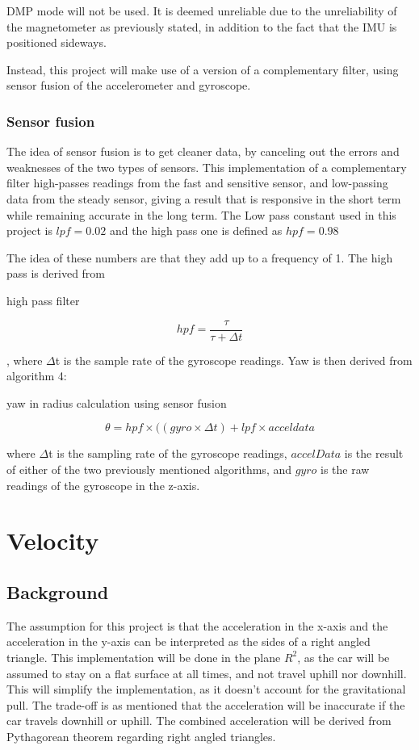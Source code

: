 \documentclass[12pt]{article}
\begin{document}
DMP mode will not be used. It is deemed unreliable due to the unreliability of the magnetometer as previously stated, in addition to the fact that the IMU is positioned sideways. 

Instead, this project will make use of a version of a complementary filter, using sensor fusion of the accelerometer and gyroscope. 

\subsubsection{Sensor fusion}
The idea of sensor fusion is to get cleaner data, by canceling out the errors and weaknesses of the two types of sensors.
This implementation of a complementary filter high-passes readings from the fast and sensitive sensor, and low-passing data from the steady sensor, giving a result that is responsive in the short term while remaining accurate in the long term. The Low pass constant used in this project is $lpf = 0.02$ and the high pass one is defined as $hpf = 0.98$

The idea of these numbers are that they add up to a frequency of 1. The high pass is derived from 
\begin{algorithm}                 
    \caption{high pass filter}    
		\[hpf = \frac{\tau}{\tau + \Delta t}\]
\end{algorithm}

, where $\Delta$t is the sample rate of the gyroscope readings. Yaw is then derived from algorithm 4:


\begin{algorithm}                 
    \caption{yaw in radius calculation using sensor fusion}    
		\[\theta = hpf\times ( (gyro\times \Delta t) + lpf\times acceldata\]
\end{algorithm}
where $\Delta$t is the sampling rate of the gyroscope readings, $accelData$ is the result of either of the two previously mentioned algorithms, and $gyro$ is the raw readings of the gyroscope in the z-axis. 

\section{Velocity}
\subsection{Background}

The assumption for this project is that the acceleration in the x-axis and the acceleration in the y-axis can be interpreted as the sides of a right angled triangle. This implementation will be done in the plane $R^2$, as the car will be assumed to stay on a flat surface at all times, and not travel uphill nor downhill. This will simplify the implementation, as it doesn't account for the gravitational pull. The trade-off is as mentioned that the acceleration will be inaccurate if the car travels downhill or uphill. The combined acceleration will be derived from Pythagorean theorem regarding right angled triangles.
\end{document}
